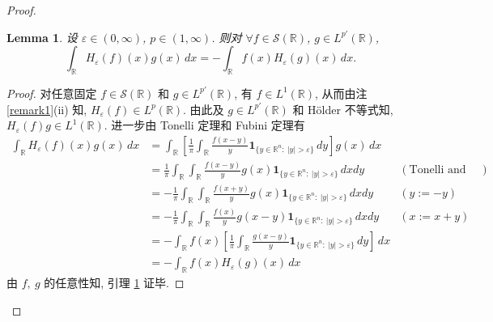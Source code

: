 \documentclass[a4paper,11pt]{article}
\newtheorem{lemma}[theorem]{Lemma}
\theoremstyle{definition}
\begin{document}
\begin{proof}
\begin{lemma} \label{lem3}
    设 $ \varepsilon \in (0, \infty) $, $ p \in (1, \infty) $. 
    则对 $ \forall f \in \mathcal{S}(\mathbb{R}) $, $ g \in L^{p'}(\mathbb{R}) $,
    $$
        \int_\mathbb{R} H_\varepsilon (f)(x) g(x) \, dx
            = -\int_\mathbb{R} f(x) H_\varepsilon (g)(x) \, dx.
    $$
\end{lemma}

\begin{proof}
    对任意固定 $ f \in \mathcal{S}(\mathbb{R}) $ 和 $ g \in L^{p'}(\mathbb{R}) $, 有 $ f \in L^1(\mathbb{R}) $, 
    从而由注 \ref{remark1}(ii) 知, $ H_\varepsilon (f) \in L^p(\mathbb{R}) $. 
    由此及 $ g \in L^{p'}(\mathbb{R}) $ 和 H\"older 不等式知, $ H_\varepsilon (f) g \in L^1(\mathbb{R}) $.
    进一步由 Tonelli 定理和 Fubini 定理有
    \begin{align*} 
        \int_\mathbb{R} H_\varepsilon (f)(x) g(x) \, dx
            &= \int_\mathbb{R} \left[ \frac{1}{\pi} \int_\mathbb{R} \frac{f(x - y)}{y} 
                \mathbf{1}_{\{y \in \mathbb{R}^n :\ |y| > \varepsilon\}} \, dy \right] g(x) \, dx \\
            &= \frac{1}{\pi} \int_\mathbb{R} \int_\mathbb{R}
                \frac{f(x - y)}{y} g(x) \mathbf{1}_{\{y \in \mathbb{R}^n :\ |y| > \varepsilon\}} \, dx dy  
                & (\text{Tonelli and Fubini}) \\
            &= -\frac{1}{\pi} \int_\mathbb{R} \int_\mathbb{R}
                \frac{f(x + y)}{y} g(x) \mathbf{1}_{\{y \in \mathbb{R}^n :\ |y| > \varepsilon\}} \, dx dy  
                & (y := -y) \\
            &= -\frac{1}{\pi} \int_\mathbb{R} \int_\mathbb{R}
                \frac{f(x)}{y} g(x - y) \mathbf{1}_{\{y \in \mathbb{R}^n :\ |y| > \varepsilon\}} \, dx dy  
                & (x := x + y) \\
            &= - \int_\mathbb{R} f(x) \left[ \frac{1}{\pi} \int_\mathbb{R}
                \frac{g(x - y)}{y} \mathbf{1}_{\{y \in \mathbb{R}^n :\ |y| > \varepsilon\}} \, dy  \right] \, dx \\
            &= - \int_\mathbb{R} f(x) H_\varepsilon (g)(x) \, dx
    \end{align*}
    由 $ f,\ g $ 的任意性知, 引理 \ref{lem3} 证毕.
\end{proof}
    

\end{proof}
\end{document}
